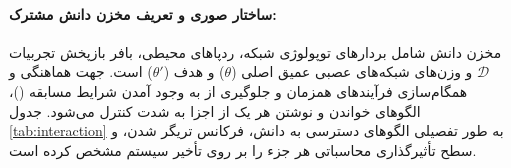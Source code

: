 \documentclass[oneside,openany,phd]{TMU-Thesis}
\begin{document}
\paragraph{ساختار صوری و تعریف مخزن دانش مشترک:}

مخزن دانش شامل بردارهای توپولوژی شبکه، ردپاهای محیطی، بافر بازپخش تجربیات $\mathcal{D}$ و وزن‌های شبکه‌های عصبی عمیق اصلی ($\theta$) و هدف ($\theta'$) است. جهت هماهنگی و همگام‌سازی فرآیندهای همزمان و جلوگیری از به وجود آمدن شرایط مسابقه ()، الگوهای خواندن و نوشتن هر یک از اجزا به شدت کنترل می‌شود. جدول \ref{tab:interaction} به طور تفصیلی الگوهای دسترسی به دانش، فرکانس تریگر شدن، و سطح تأثیرگذاری محاسباتی هر جزء را بر روی تأخیر سیستم مشخص کرده است.



\begin{table}[H]

\centering

\caption{الگوهای دسترسی صوری و همگام‌سازی مؤلفه‌ها در مخزن دانش مشترک \cite{kephart2003vision}}

\label{tab:interaction}


\end{table}
\end{document}
